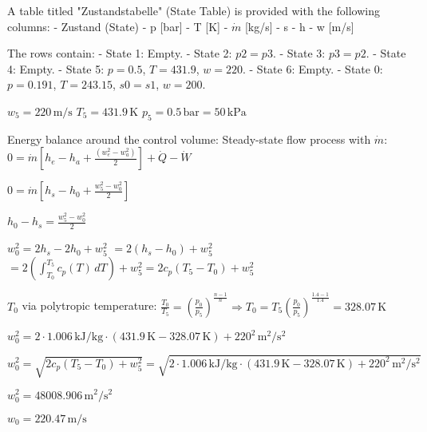 A table titled "Zustandstabelle" (State Table) is provided with the following columns:  
- Zustand (State)  
- p [bar]  
- T [K]  
- \( \dot{m} \) [kg/s]  
- s  
- h  
- w [m/s]  

The rows contain:  
- State 1: Empty.  
- State 2: \( p2 = p3 \).  
- State 3: \( p3 = p2 \).  
- State 4: Empty.  
- State 5: \( p = 0.5 \), \( T = 431.9 \), \( w = 220 \).  
- State 6: Empty.  
- State 0: \( p = 0.191 \), \( T = 243.15 \), \( s0 = s1 \), \( w = 200 \).

\( w_5 = 220 \, \text{m/s} \)  
\( T_5 = 431.9 \, \text{K} \)  
\( p_5 = 0.5 \, \text{bar} = 50 \, \text{kPa} \)  

Energy balance around the control volume: Steady-state flow process with \( \dot{m} \):  
\( 0 = \dot{m} \left[ h_e - h_a + \frac{(w_e^2 - w_a^2)}{2} \right] + \dot{Q} - \dot{W} \)  

\( 0 = \dot{m} \left[ h_s - h_0 + \frac{w_5^2 - w_0^2}{2} \right] \)  

\( h_0 - h_s = \frac{w_5^2 - w_0^2}{2} \)  

\( w_0^2 = 2 h_s - 2 h_0 + w_5^2 \)  
\( = 2 (h_s - h_0) + w_5^2 \)  
\( = 2 \left( \int_{T_0}^{T_5} c_p(T) \, dT \right) + w_5^2 = 2 c_p (T_5 - T_0) + w_5^2 \)  

\( T_0 \) via polytropic temperature:  
\( \frac{T_0}{T_5} = \left( \frac{p_0}{p_5} \right)^{\frac{n-1}{n}} \Rightarrow T_0 = T_5 \left( \frac{p_0}{p_5} \right)^{\frac{1.4 - 1}{1.4}} = 328.07 \, \text{K} \)  

\( w_0^2 = 2 \cdot 1.006 \, \text{kJ/kg} \cdot (431.9 \, \text{K} - 328.07 \, \text{K}) + 220^2 \, \text{m}^2/\text{s}^2 \)  

\( w_0^2 = \sqrt{2 c_p (T_5 - T_0) + w_5^2} = \sqrt{2 \cdot 1.006 \, \text{kJ/kg} \cdot (431.9 \, \text{K} - 328.07 \, \text{K}) + 220^2 \, \text{m}^2/\text{s}^2} \)  

\( w_0^2 = 48008.906 \, \text{m}^2/\text{s}^2 \)  

\( w_0 = 220.47 \, \text{m/s} \)
